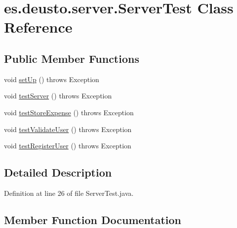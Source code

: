 \hypertarget{classes_1_1deusto_1_1server_1_1_server_test}{}\section{es.\+deusto.\+server.\+Server\+Test Class Reference}
\label{classes_1_1deusto_1_1server_1_1_server_test}
\subsection*{Public Member Functions}
\begin{DoxyCompactItemize}
\item 
void \hyperlink{classes_1_1deusto_1_1server_1_1_server_test_af715b0b972d52aaa4d90bf086f990921}{set\+Up} ()  throws Exception 
\item 
void \hyperlink{classes_1_1deusto_1_1server_1_1_server_test_a9c697e77e1422a1d0835f6e6a38036f4}{test\+Server} ()  throws Exception 
\item 
void \hyperlink{classes_1_1deusto_1_1server_1_1_server_test_a7406203a7ff08400597008ca722f6205}{test\+Store\+Expense} ()  throws Exception 
\item 
void \hyperlink{classes_1_1deusto_1_1server_1_1_server_test_af493f29fde42af9e7d4c065f49bf8502}{test\+Validate\+User} ()  throws Exception 
\item 
void \hyperlink{classes_1_1deusto_1_1server_1_1_server_test_ab50ebca6957682f2a7e6e51dc06278cf}{test\+Register\+User} ()  throws Exception 
\end{DoxyCompactItemize}


\subsection{Detailed Description}


Definition at line 26 of file Server\+Test.\+java.



\subsection{Member Function Documentation}
\mbox{\label{classes_1_1deusto_1_1server_1_1_server_test_af715b0b972d52aaa4d90bf086f990921}} 
